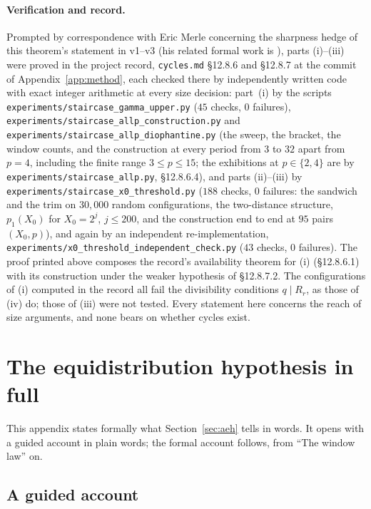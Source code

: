 \documentclass[11pt]{article}
\theoremstyle{remark}
\begin{document}
\paragraph{Verification and record.}
Prompted by correspondence with Eric Merle concerning the sharpness hedge of this theorem's statement in v1--v3 (his related formal work is \cite{merle}), parts (i)--(iii) were proved in the project record, \texttt{cycles.md} \S12.8.6 and \S12.8.7 at the commit of Appendix~\ref{app:method}, each checked there by independently written code with exact integer arithmetic at every size decision: part~(i) by the scripts \texttt{experiments/staircase\_gamma\_upper.py} ($45$ checks, $0$ failures), \texttt{experiments/\allowbreak staircase\_allp\_construction.py} and \texttt{experiments/\allowbreak staircase\_allp\_diophantine.py} (the sweep, the bracket, the window counts, and the construction at every period from $3$ to $32$ apart from $p = 4$, including the finite range $3 \le p \le 15$; the exhibitions at $p \in \{2,4\}$ are by \texttt{experiments/staircase\_allp.py}, \S12.8.6.4), and parts (ii)--(iii) by \texttt{experiments/staircase\_x0\_threshold.py} ($188$ checks, $0$ failures: the sandwich and the trim on $30{,}000$ random configurations, the two-distance structure, $p_1(X_0)$ for $X_0 = 2^j$, $j \le 200$, and the construction end to end at $95$ pairs $(X_0, p)$), and again by an independent re-implementation, \texttt{experiments/x0\_threshold\_independent\_check.py} ($43$ checks, $0$ failures). The proof printed above composes the record's availability theorem for (i) (\S12.8.6.1) with its construction under the weaker hypothesis of \S12.8.7.2. The configurations of (i) computed in the record all fail the divisibility conditions $q \mid R_r$, as those of (iv) do; those of (iii) were not tested. Every statement here concerns the reach of size arguments, and none bears on whether cycles exist.

\section{The equidistribution hypothesis in full}\label{app:aeh}

This appendix states formally what Section~\ref{sec:aeh} tells in words. It opens with a guided account in plain words; the formal account follows, from ``The window law'' on.

\subsection*{A guided account}
\end{document}
